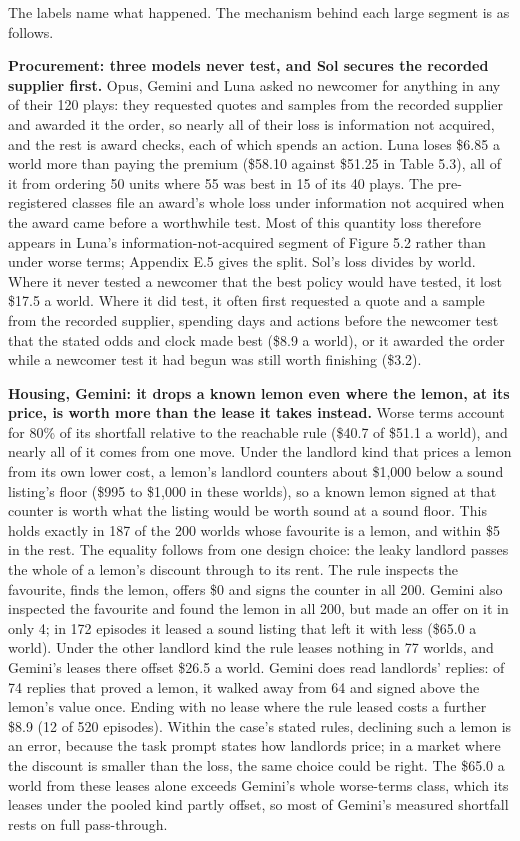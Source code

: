 The labels name what happened. The mechanism behind each large segment is as follows.

\textbf{Procurement: three models never test, and Sol secures the recorded supplier first.} Opus, Gemini and Luna asked
no newcomer for anything in any of their 120 plays: they requested quotes and samples from the recorded supplier and
awarded it the order, so nearly all of their loss is information not acquired, and the rest is award checks, each of
which spends an action. Luna loses \$6.85 a world more than paying the premium (\$58.10 against \$51.25 in Table 5.3), all of it from
ordering 50 units where 55 was best in 15 of its 40 plays. The pre-registered classes file an award's whole loss under
information not acquired when the award came before a worthwhile test. Most of this quantity loss therefore appears
in Luna's information-not-acquired segment of Figure 5.2 rather than under worse terms; Appendix E.5 gives the split. Sol's loss divides by
world. Where it never tested a newcomer that the best policy would have tested, it lost \$17.5 a world. Where it did
test, it often first requested a quote and a sample from the recorded supplier, spending days and actions before the
newcomer test that the stated odds and clock made best (\$8.9 a world), or it awarded the order while a newcomer test
it had begun was still worth finishing (\$3.2).

\textbf{Housing, Gemini: it drops a known lemon even where the lemon, at its price, is worth more than the lease it takes
instead.} Worse terms account for 80\% of
its shortfall relative to the reachable rule (\$40.7 of \$51.1 a world), and nearly all of it comes from one move. Under
the landlord kind that prices a lemon from its own lower cost, a lemon's landlord counters about \$1,000 below a sound
listing's floor (\$995 to \$1,000 in these worlds), so a known lemon signed at that counter is worth what the listing
would be worth sound at a sound floor. This holds exactly in 187 of the 200 worlds whose favourite is a lemon, and
within \$5 in the rest. The equality follows from one design choice: the leaky landlord passes the whole of a lemon's
discount through to its rent. The rule inspects the favourite, finds the lemon, offers \$0 and signs the counter in all 200.
Gemini also inspected the favourite and found the lemon in all 200, but made an offer on it in only 4; in 172 episodes
it leased a sound listing that left it with less (\$65.0 a world). Under the other landlord kind the rule leases nothing
in 77 worlds, and Gemini's leases there offset \$26.5 a world. Gemini does read landlords' replies: of 74 replies that
proved a lemon, it walked away from 64 and signed above the lemon's value once. Ending with no lease where the rule
leased costs a further \$8.9 (12 of 520 episodes). Within the case's stated rules, declining such a lemon is an error, because
the task prompt states how landlords price; in a market where the discount is smaller than the loss, the same choice
could be right. The \$65.0 a world from these leases alone exceeds Gemini's whole worse-terms class, which its leases
under the pooled kind partly offset, so most of Gemini's measured shortfall rests on full pass-through.

